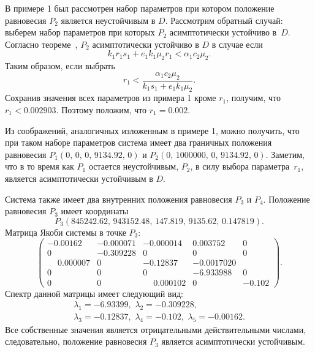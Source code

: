 \documentclass[14pt,a4paper]{extarticle}
\begin{document}
	\begin{example}
		В примере 1 был рассмотрен набор параметров при котором положение равновесия $P_2$ является неустойчивым в $D$. Рассмотрим обратный случай: выберем набор параметров при которых $P_2$ асимптотически устойчиво в~$D$. Согласно теореме~, $P_2$ асимптотически устойчиво в $D$ в случае если
		\[k_1r_1s_1 + e_1k_1\mu_2r_1 < \alpha_1c_2\mu_2.\]
		Таким образом, если выбрать 
		\[r_1 < \dfrac{\alpha_1c_2\mu_2}{k_1s_1 + e_1k_1\mu_2}.\]
		Сохранив значения всех параметров из примера 1 кроме $r_1$, получим, что $r_1 < 0.002903$. Поэтому положим, что $r_1=0.002$.
		
		Из соображений, аналогичных изложенным в примере 1, можно получить, что при таком наборе параметров система имеет два граничных положения равновесия $P_1\left(0,\,0,\,0,\,9134.92,\,0\right)$ и $P_2\left(0,\,1000000,\,0,\,9134.92,\,0\right)$.
		Заметим, что в то время как $P_1$ остается неустойчивым, $P_2$, в силу выбора параметра~$r_1$, является асимптотически устойчивым в $D$.
		
		Система также имеет два внутренних положения равновесия $P_3$ и $P_4$. Положение равновесия $P_3$ имеет координаты
		\[P_3\left(845242.62,\, 943152.48,\, 147.819,\, 9135.62,\, 0.147819\right).\]
		Матрица Якоби системы в точке $P_3$: 
		\[\begin{pmatrix}
			-0.00162 & -0.000071& -0.000014&  0.003752&  0\\
			 0  &     -0.309228  & 0     &   0     &   0\\
			 \phantom{-}0.000007 & 0    &   -0.12837&  -0.001702  0\\
			 0&        0&        0     &  -6.933988&  0\\
			 0 &       0&        \phantom{-}0.000102 & 0 &       -0.102
		\end{pmatrix}.\]
		Спектр данной матрицы имеет следующий вид:
		\begin{multline*}
			\lambda_1=-6.93399,\,\, \lambda_2=-0.309228,\\
			\lambda_3=-0.12837,\,\, \lambda_4=-0.102,\,\, \lambda_5=-0.00162.
		\end{multline*}
		Все собственные значения является отрицательными действительными числами, следовательно, положение равновесия $P_3$ является асимптотически устойчивым.
		

\end{example}
\end{document}
